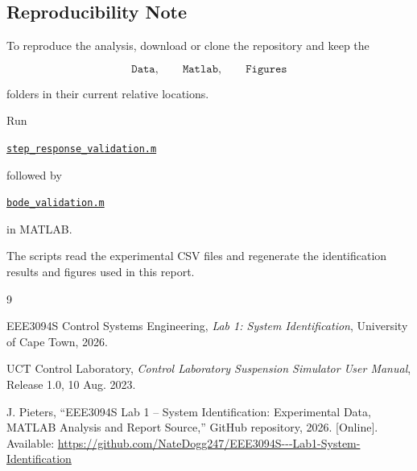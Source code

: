 \documentclass[12pt,a4paper]{article}
\newcommand{\stepcodeurl}{
https://github.com/NateDogg247/EEE3094S---Lab1-System-Identification/blob/main/Matlab/step_response_validation.m
}
\newcommand{\bodecodeurl}{
https://github.com/NateDogg247/EEE3094S---Lab1-System-Identification/blob/main/Matlab/bode_validation.m
}
\begin{document}
\newpage

\subsection{Reproducibility Note}

To reproduce the analysis, download or clone the repository and
keep the

\[
\texttt{Data},
\qquad
\texttt{Matlab},
\qquad
\texttt{Figures}
\]

folders in their current relative locations.

\vspace{0.5cm}

Run

\href{\stepcodeurl}{
    \texttt{step\_response\_validation.m}
}

followed by

\href{\bodecodeurl}{
    \texttt{bode\_validation.m}
}

in MATLAB.

\vspace{0.5cm}

The scripts read the experimental CSV files and regenerate the
identification results and figures used in this report.


\clearpage
{}
{}

\begin{thebibliography}{9}

EEE3094S Control Systems Engineering,
\emph{Lab 1: System Identification},
University of Cape Town, 2026.

UCT Control Laboratory,
\emph{Control Laboratory Suspension Simulator User Manual},
Release 1.0, 10 Aug. 2023.

J. Pieters,
``EEE3094S Lab 1 -- System Identification: Experimental Data,
MATLAB Analysis and Report Source,''
GitHub repository, 2026.
[Online]. Available:
\url{
https://github.com/NateDogg247/EEE3094S---Lab1-System-Identification
}

\end{thebibliography}
\end{document}
